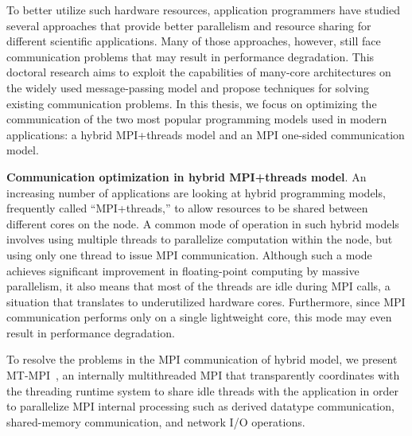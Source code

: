 To better utilize such hardware resources, application programmers
have studied several approaches that provide better parallelism and
resource sharing for different scientific applications. Many of those
approaches, however, still face communication problems that may result
in performance degradation. This doctoral research aims to exploit the
capabilities of many-core architectures on the widely used
message-passing model and propose techniques for solving existing
communication problems. In this thesis, we focus on optimizing the
communication of the two most popular programming models used in
modern applications: a hybrid MPI+threads model and an MPI one-sided
communication model.

\vspace{0.2ex}
\noindent\textbf{Communication optimization in hybrid MPI+threads
  model}.  An increasing number of applications are looking at hybrid
programming models, frequently called ``MPI+threads,'' to allow
resources to be shared between different cores on the node. A common
mode of operation in such hybrid models involves using multiple
threads to parallelize computation within the node, but using only one
thread to issue MPI communication. Although such a mode achieves
significant improvement in floating-point computing by massive
parallelism, it also means that most of the threads are idle during
MPI calls, a situation that translates to underutilized hardware
cores. Furthermore, since MPI communication performs only on a single
lightweight core, this mode may even result in performance
degradation.

To resolve the problems in the MPI communication of hybrid model, we
present MT-MPI~\cite{mtmpi}, an internally multithreaded MPI that
transparently coordinates with the threading runtime system to share
idle threads with the application in order to parallelize MPI internal
processing such as derived datatype communication, shared-memory
communication, and network I/O operations.

